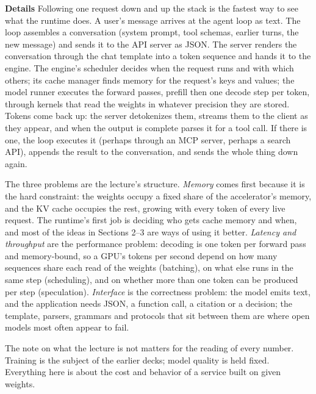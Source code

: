 \documentclass[11pt,letterpaper]{article}
\newcommand{\para}[1]{\medskip\noindent\textbf{#1}\quad}
\begin{document}
\para{Details} Following one request down and up the stack is the fastest way to see what the runtime does. A user's message arrives at the agent loop as text. The loop assembles a conversation (system prompt, tool schemas, earlier turns, the new message) and sends it to the API server as JSON. The server renders the conversation through the chat template into a token sequence and hands it to the engine. The engine's scheduler decides when the request runs and with which others; its cache manager finds memory for the request's keys and values; the model runner executes the forward passes, prefill then one decode step per token, through kernels that read the weights in whatever precision they are stored. Tokens come back up: the server detokenizes them, streams them to the client as they appear, and when the output is complete parses it for a tool call. If there is one, the loop executes it (perhaps through an MCP server, perhaps a search API), appends the result to the conversation, and sends the whole thing down again.

The three problems are the lecture's structure. \emph{Memory} comes first because it is the hard constraint: the weights occupy a fixed share of the accelerator's memory, and the KV cache occupies the rest, growing with every token of every live request. The runtime's first job is deciding who gets cache memory and when, and most of the ideas in Sections 2--3 are ways of using it better. \emph{Latency and throughput} are the performance problem: decoding is one token per forward pass and memory-bound, so a GPU's tokens per second depend on how many sequences share each read of the weights (batching), on what else runs in the same step (scheduling), and on whether more than one token can be produced per step (speculation). \emph{Interface} is the correctness problem: the model emits text, and the application needs JSON, a function call, a citation or a decision; the template, parsers, grammars and protocols that sit between them are where open models most often appear to fail.

The note on what the lecture is not matters for the reading of every number. Training is the subject of the earlier decks; model quality is held fixed. Everything here is about the cost and behavior of a service built on given weights.
\end{document}
